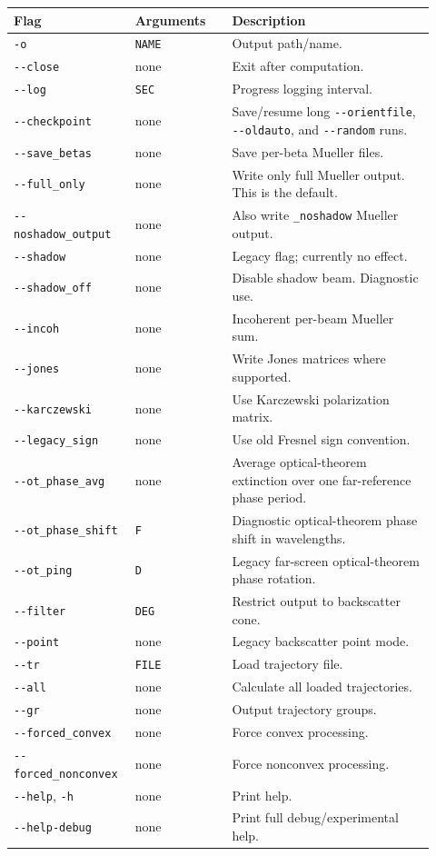 \documentclass[
  10pt,
  a4paper,
]{article}
\begin{document}
\begin{longtable}[]{@{}L{0.24\linewidth}L{0.22\linewidth}L{0.46\linewidth}@{}}
\toprule\noalign{}
Flag & Arguments & Description \\
\midrule\noalign{}
\endhead
\bottomrule\noalign{}
\endlastfoot
\texttt{-o} & \texttt{NAME} & Output path/name. \\
\texttt{-\/-close} & none & Exit after computation. \\
\texttt{-\/-log} & \texttt{SEC} & Progress logging interval. \\
\texttt{-\/-checkpoint} & none & Save/resume long
\texttt{-\/-orientfile}, \texttt{-\/-oldauto}, and \texttt{-\/-random}
runs. \\
\texttt{-\/-save\_betas} & none & Save per-beta Mueller files. \\
\texttt{-\/-full\_only} & none & Write only full Mueller output. This is
the default. \\
\texttt{-\/-noshadow\_output} & none & Also write \texttt{\_noshadow}
Mueller output. \\
\texttt{-\/-shadow} & none & Legacy flag; currently no effect. \\
\texttt{-\/-shadow\_off} & none & Disable shadow beam. Diagnostic
use. \\
\texttt{-\/-incoh} & none & Incoherent per-beam Mueller sum. \\
\texttt{-\/-jones} & none & Write Jones matrices where supported. \\
\texttt{-\/-karczewski} & none & Use Karczewski polarization matrix. \\
\texttt{-\/-legacy\_sign} & none & Use old Fresnel sign convention. \\
\texttt{-\/-ot\_phase\_avg} & none & Average optical-theorem extinction
over one far-reference phase period. \\
\texttt{-\/-ot\_phase\_shift} & \texttt{F} & Diagnostic optical-theorem
phase shift in wavelengths. \\
\texttt{-\/-ot\_ping} & \texttt{D} & Legacy far-screen optical-theorem
phase rotation. \\
\texttt{-\/-filter} & \texttt{DEG} & Restrict output to backscatter
cone. \\
\texttt{-\/-point} & none & Legacy backscatter point mode. \\
\texttt{-\/-tr} & \texttt{FILE} & Load trajectory file. \\
\texttt{-\/-all} & none & Calculate all loaded trajectories. \\
\texttt{-\/-gr} & none & Output trajectory groups. \\
\texttt{-\/-forced\_convex} & none & Force convex processing. \\
\texttt{-\/-forced\_nonconvex} & none & Force nonconvex processing. \\
\texttt{-\/-help}, \texttt{-h} & none & Print help. \\
\texttt{-\/-help-debug} & none & Print full debug/experimental help. \\
\end{longtable}
\end{document}
